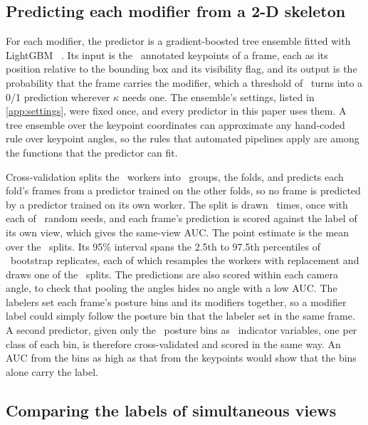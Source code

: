 \documentclass[review,3p,authoryear]{elsarticle}
\begin{document}
\subsection{Predicting each modifier from a 2-D skeleton}
\label{met:predictor}

For each modifier, the predictor is a gradient-boosted tree ensemble fitted with LightGBM
\lightgbmVersion\ \citep{ke2017lightgbm}. Its input is the \nKeypoints\ annotated
keypoints of a frame, each as its position relative to the bounding box and its
visibility flag, and its output is the probability that the frame carries the modifier,
which a threshold of \adjThreshold\ turns into a 0/1 prediction wherever $\kappa$ needs
one. The ensemble's settings, listed in \ref{app:settings}, were fixed once, and every
predictor in this paper uses them. A tree ensemble over the keypoint coordinates can
approximate any hand-coded rule over keypoint angles, so the rules that automated
pipelines apply are among the functions that the predictor can fit.

Cross-validation splits the \nSubjects\ workers into \nFolds\ groups, the folds, and
predicts each fold's frames from a predictor trained on the other folds, so no frame is predicted
by a predictor trained on its own worker. The split is drawn \nSeeds\ times, once with each
of \nSeeds\ random seeds, and each frame's prediction is scored against the label of its
own view, which gives the same-view AUC. The point estimate is the mean over the \nSeeds\
splits. Its 95\% interval spans the 2.5th to 97.5th percentiles of \nBoot\ bootstrap
replicates, each of which resamples the workers with replacement and draws one of the
\nSeeds\ splits. The predictions are also scored within each camera angle, to check that
pooling the angles hides no angle with a low AUC. The labelers set each frame's posture
bins and its modifiers together, so a modifier label could simply follow the posture bin
that the labeler set in the same frame. A second predictor, given only the \nPostureBins\ posture bins as
\ablNBinFeatures\ indicator variables, one per class of each bin, is therefore
cross-validated and scored in the same way. An AUC from the bins as high as that from the
keypoints would show that the bins alone carry the label.

\subsection{Comparing the labels of simultaneous views}
\label{met:crossview}
\end{document}
